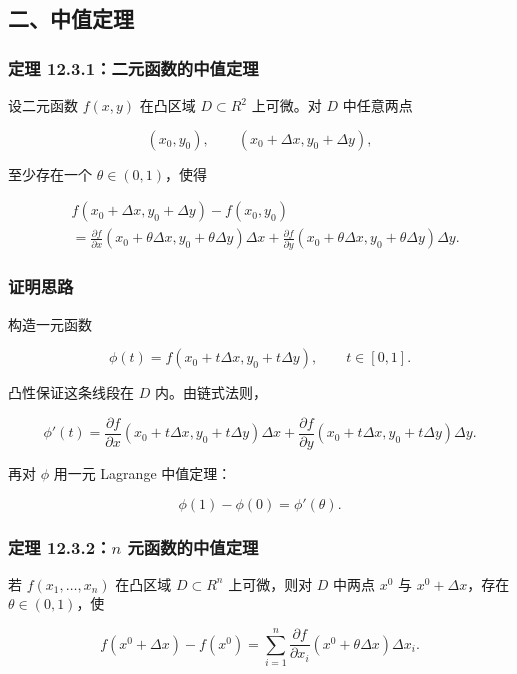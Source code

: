 \subsection*{二、中值定理}

\subsubsection*{定理 12.3.1：二元函数的中值定理}

设二元函数 \(f(x,y)\) 在凸区域 \(D\subset R^2\) 上可微。对 \(D\) 中任意两点

\[
      (x_0,y_0),\qquad (x_0+\Delta x,y_0+\Delta y),
    \]

至少存在一个 \(\theta\in(0,1)\)，使得

\[
      \begin{aligned}
      &f(x_0+\Delta x,y_0+\Delta y)-f(x_0,y_0)\\
      &=
      \frac{\partial f}{\partial x}(x_0+\theta\Delta x,y_0+\theta\Delta y)\Delta x
      +
      \frac{\partial f}{\partial y}(x_0+\theta\Delta x,y_0+\theta\Delta y)\Delta y.
      \end{aligned}
    \]

\subsubsection*{证明思路}

构造一元函数

\[
      \phi(t)=f(x_0+t\Delta x,y_0+t\Delta y),\qquad t\in[0,1].
    \]

凸性保证这条线段在 \(D\) 内。由链式法则，

\[
      \phi'(t)=
      \frac{\partial f}{\partial x}(x_0+t\Delta x,y_0+t\Delta y)\Delta x
      +
      \frac{\partial f}{\partial y}(x_0+t\Delta x,y_0+t\Delta y)\Delta y.
    \]

再对 \(\phi\) 用一元 Lagrange 中值定理：

\[
      \phi(1)-\phi(0)=\phi'(\theta).
    \]

\subsubsection*{定理 12.3.2：\(n\) 元函数的中值定理}

若 \(f(x_1,\ldots,x_n)\) 在凸区域 \(D\subset R^n\) 上可微，则对 \(D\) 中两点 \(x^0\) 与 \(x^0+\Delta x\)，存在 \(\theta\in(0,1)\)，使

\[
      f(x^0+\Delta x)-f(x^0)
      =
      \sum_{i=1}^n
      \frac{\partial f}{\partial x_i}(x^0+\theta\Delta x)\Delta x_i.
    \]

